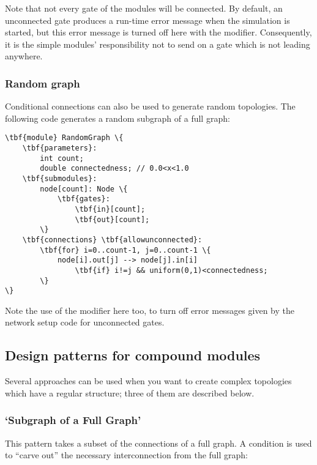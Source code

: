 Note that not every gate of the modules will be connected. By default,
an unconnected gate produces a run-time error message when the
simulation is started, but this error message is turned off here with
the  modifier.
Consequently, it is the simple modules' responsibility not to send
on a gate which is not leading anywhere.



\subsubsection{Random graph}

Conditional connections can also be used to generate random
topologies.  The following code generates a
random subgraph of a full graph:

\begin{Verbatim}[commandchars=\\\{\}]
\tbf{module} RandomGraph \{
    \tbf{parameters}:
        int count;
        double connectedness; // 0.0<x<1.0
    \tbf{submodules}:
        node[count]: Node \{
            \tbf{gates}:
                \tbf{in}[count];
                \tbf{out}[count];
        \}
    \tbf{connections} \tbf{allowunconnected}:
        \tbf{for} i=0..count-1, j=0..count-1 \{
            node[i].out[j] --> node[j].in[i]
                \tbf{if} i!=j && uniform(0,1)<connectedness;
        \}
\}
\end{Verbatim}

Note the use of the  modifier
here too, to turn off error messages given by the network setup code
for unconnected gates.


\subsection{Design patterns for compound modules}


Several approaches can be used when you want to create complex
topologies which have a regular structure; three of them are
described below.


\subsubsection{`Subgraph of a Full Graph'}


This pattern takes a subset of the connections of a full graph.  A
condition is used to ``carve out'' the necessary interconnection from
the full graph:

